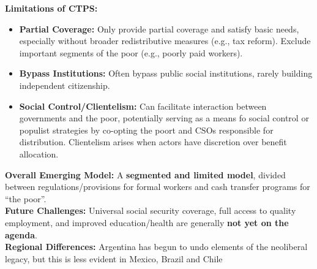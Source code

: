\documentclass{article}
\begin{document}
    \noindent \textbf{Limitations of CTPS:}
    \begin{itemize}
        \item \textbf{Partial Coverage:} Only provide partial coverage and
        satisfy basic needs, especially without broader redistributive
        measures (e.g., tax reform). Exclude important segments of the
        poor (e.g., poorly paid workers).
        \item \textbf{Bypass Institutions:} Often bypass public social
        institutions, rarely building independent citizenship.
        \item \textbf{Social Control/Clientelism:} Can facilitate
        interaction between governments and the poor, potentially serving as
        a means fo social control or populist strategies by co-opting the
        poort and CSOs responsible for distribution. Clientelism arises when
        actors have discretion over benefit allocation.
    \end{itemize}

    \noindent \textbf{Overall Emerging Model:} A
\textbf{segmented and limited model}, divided between regulations/provisions
for formal workers and cash transfer programs for ``the poor''.\\

    \noindent \textbf{Future Challenges:} Universal social security
coverage, full access to quality employment, and improved education/health
are generally \textbf{not yet on the agenda}.\\

    \noindent \textbf{Regional Differences:} Argentina has begun to undo
elements of the neoliberal legacy, but this is less evident in Mexico,
Brazil and Chile
\end{document}
